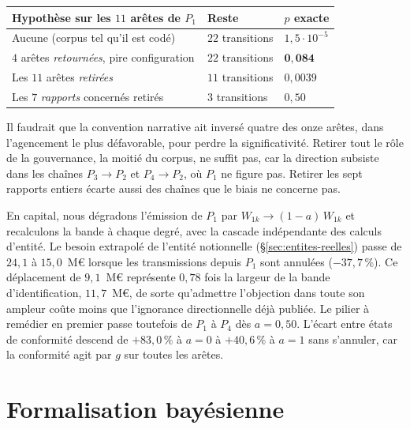 \begin{center}\small
\renewcommand{\arraystretch}{1.25}
\begin{tabular}{@{}l l l@{}}
\toprule
\textbf{Hypothèse sur les $11$ arêtes de $P_1$} & \textbf{Reste} & $p$ \textbf{exacte} \\
\midrule
Aucune (corpus tel qu'il est codé) & $22$ transitions & $1{,}5\cdot10^{-5}$ \\
$4$ arêtes \emph{retournées}, pire configuration & $22$ transitions & $\mathbf{0{,}084}$ \\
Les $11$ arêtes \emph{retirées} & $11$ transitions & $0{,}0039$ \\
Les $7$ \emph{rapports} concernés retirés & $3$ transitions & $0{,}50$ \\
\bottomrule
\end{tabular}
\end{center}

\vspace{2pt}
\noindent Il faudrait que la convention narrative ait inversé quatre des onze arêtes, dans
l'agencement le plus défavorable, pour perdre la significativité. Retirer tout le rôle de la
gouvernance, la moitié du corpus, ne suffit pas, car la direction subsiste dans les chaînes
$P_3\to P_2$ et $P_4\to P_2$, où $P_1$ ne figure pas. Retirer les sept rapports entiers écarte aussi
des chaînes que le biais ne concerne pas.

En capital, nous dégradons l'émission de $P_1$ par $W_{1k}\to(1-a)\,W_{1k}$ et recalculons la bande
à chaque degré, avec la cascade indépendante des calculs d'entité. Le besoin extrapolé de l'entité notionnelle (\S\ref{sec:entites-reelles}) passe de $24{,}1$ à
$15{,}0$~M\euro{} lorsque les transmissions depuis $P_1$ sont annulées ($-37{,}7\,\%$). Ce déplacement de $9{,}1$~M\euro{} représente
$0{,}78$ fois la largeur de la bande d'identification, $11{,}7$~M\euro, de sorte qu'admettre
l'objection dans toute son ampleur coûte moins que l'ignorance directionnelle déjà publiée. Le pilier
à remédier en premier passe toutefois de $P_1$ à $P_4$ dès $a = 0{,}50$. L'écart entre états de
conformité descend de $+83{,}0\,\%$ à $a=0$ à $+40{,}6\,\%$ à $a=1$ sans s'annuler, car la
conformité agit par $g$ sur toutes les arêtes.


\section{Formalisation bayésienne}
\label{sec:bayes}

